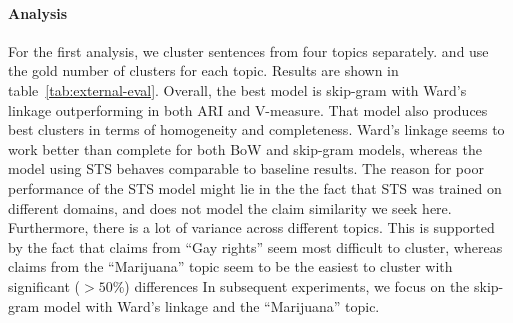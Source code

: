 \paragraph{Analysis } 
For the first analysis, we cluster sentences from four topics separately. 
and use the gold number of clusters for each topic. 
Results are shown in table~\ref{tab:external-eval}. 
Overall, the best model is skip-gram with Ward's linkage 
outperforming in both ARI and V-measure. 
That model also produces best clusters in terms of homogeneity and 
completeness. 
Ward's linkage seems to work better than complete for both BoW and skip-gram models, whereas
the model using STS behaves comparable to baseline results. 
The reason for poor performance of the STS model might lie in the
the fact that STS was trained 
on different domains, and does not model the claim similarity we seek here.  
Furthermore, there is a lot of variance across different topics. 
This is supported by the fact that claims from ``Gay rights'' seem most
difficult to cluster, whereas claims from the 
``Marijuana'' topic seem to be the easiest to cluster with significant ($>50\%$) differences 
In subsequent experiments, we focus on the skip-gram model 
with Ward's linkage and the ``Marijuana'' topic. 

